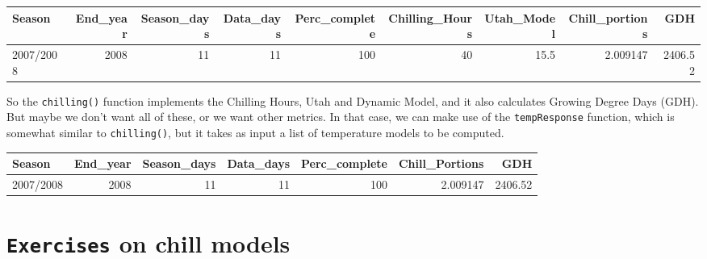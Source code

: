 \documentclass[
]{book}
\newenvironment{Shaded}{\begin{snugshade}}{\end{snugshade}}
\newcommand{\DataTypeTok}[1]{\textcolor[rgb]{0.13,0.29,0.53}{#1}}
\newcommand{\DecValTok}[1]{\textcolor[rgb]{0.00,0.00,0.81}{#1}}
\newcommand{\KeywordTok}[1]{\textcolor[rgb]{0.13,0.29,0.53}{\textbf{#1}}}
\newcommand{\NormalTok}[1]{#1}
\newcommand{\OperatorTok}[1]{\textcolor[rgb]{0.81,0.36,0.00}{\textbf{#1}}}
\newcommand{\StringTok}[1]{\textcolor[rgb]{0.31,0.60,0.02}{#1}}
\begin{document}
\begingroup\fontsize{10}{12}\selectfont

\begin{tabular}{l|r|r|r|r|r|r|r|r}
\hline
Season & End\_year & Season\_days & Data\_days & Perc\_complete & Chilling\_Hours & Utah\_Model & Chill\_portions & GDH\\
\hline
2007/2008 & 2008 & 11 & 11 & 100 & 40 & 15.5 & 2.009147 & 2406.52\\
\hline
\end{tabular}
\endgroup{}

So the \texttt{chilling()} function implements the Chilling Hours, Utah and Dynamic Model, and it also calculates Growing Degree Days (GDH). But maybe we don't want all of these, or we want other metrics. In that case, we can make use of the \texttt{tempResponse} function, which is somewhat similar to \texttt{chilling()}, but it takes as input a list of temperature models to be computed.

\begin{Shaded}
\end{Shaded}

\begingroup\fontsize{10}{12}\selectfont

\begin{tabular}{l|r|r|r|r|r|r}
\hline
Season & End\_year & Season\_days & Data\_days & Perc\_complete & Chill\_Portions & GDH\\
\hline
2007/2008 & 2008 & 11 & 11 & 100 & 2.009147 & 2406.52\\
\hline
\end{tabular}
\endgroup{}

\hypertarget{exercises_chill_models}{%
\section*{\texorpdfstring{\texttt{Exercises} on chill models}{Exercises on chill models}}\label{exercises_chill_models}}
\end{document}
